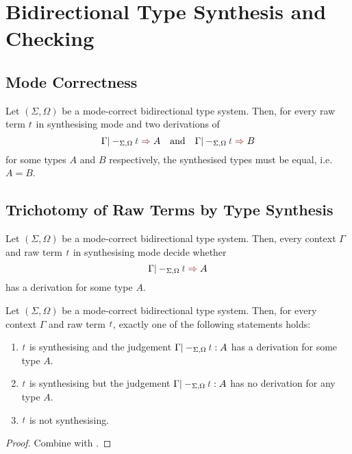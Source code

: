 
\section{Bidirectional Type Synthesis and Checking} \label{sec:type-synthesis}

\subsection{Mode Correctness}
\begin{definition} \label{def:mode-correctness}
\end{definition}


\begin{theorem}\label{thm:unique-syn}
  Let $(\Sigma, \Omega)$ be a mode-correct bidirectional type system.
  Then, for every raw term $\isTerm{t}$ in synthesising mode and two derivations of 
  \[
    \Gamma |-_{\Sigma, \Omega} \isTerm{t} \syn A
    \quad\text{and}\quad
    \Gamma |-_{\Sigma, \Omega} \isTerm{t} \syn B
  \]
  for some types $A$ and $B$ respectively, the synthesised types must be equal, i.e.\ $A = B$.
\end{theorem}
 

\subsection{Trichotomy of Raw Terms by Type Synthesis}

\begin{theorem} \label{thm:bidirectional-type-synthesis}
  Let $(\Sigma, \Omega)$ be a mode-correct bidirectional type system.
  Then, every context $\Gamma$ and raw term $\isTerm{t}$ in synthesising mode decide whether
  \[
    \Gamma |-_{\Sigma, \Omega} \isTerm{t} \syn A
  \]
  has a derivation for some type $A$.
\end{theorem}

\begin{corollary}\label{cor:trichotomy}
  Let $(\Sigma, \Omega)$ be a mode-correct bidirectional type system.
  Then, for every context $\Gamma$ and raw term $\isTerm{t}$, exactly one of the following statements holds:
  \begin{enumerate}
    \item $\isTerm{t}$ is synthesising and the judgement $\Gamma |-_{\Sigma, \Omega} \isTerm{t} : A$ has a derivation for some type $A$.
    \item $\isTerm{t}$ is synthesising but the judgement $\Gamma |-_{\Sigma, \Omega} \isTerm{t} : A$ has no derivation for any type $A$.
    \item $\isTerm{t}$ is not synthesising.
  \end{enumerate}
\end{corollary}
\begin{proof}
  Combine   with .
  
\end{proof}

